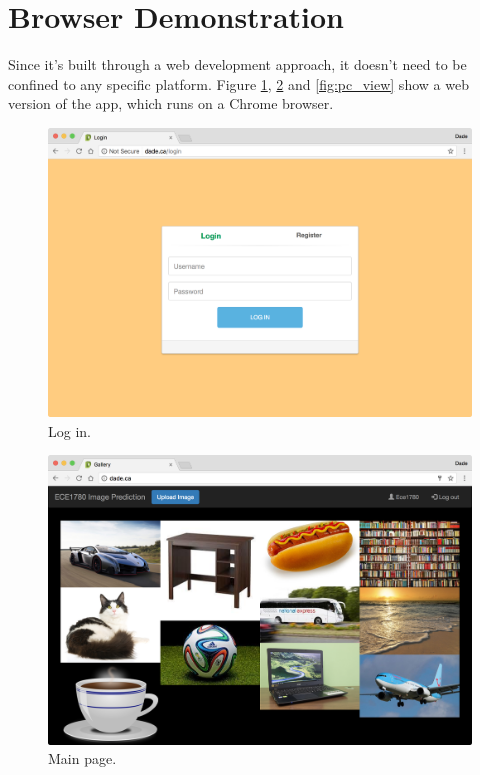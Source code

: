 \documentclass[conference]{IEEEtran}
\begin{document}
\section{Browser Demonstration}
Since it's built through a web development approach, it doesn't need to be confined to any specific platform. Figure \ref{fig:pc_login}, \ref{fig:pc_main} and \ref{fig:pc_view} show a web version of the app, which runs on a Chrome browser.

\begin{figure}
  \centering
  \includegraphics[width=\linewidth]{pc_login.png}
  \caption{Log in.}
  \label{fig:pc_login}
\end{figure}

\begin{figure}
  \centering
  \includegraphics[width=\linewidth]{pc_main.png}
  \caption{Main page.}
  \label{fig:pc_main}
\end{figure}
\end{document}
